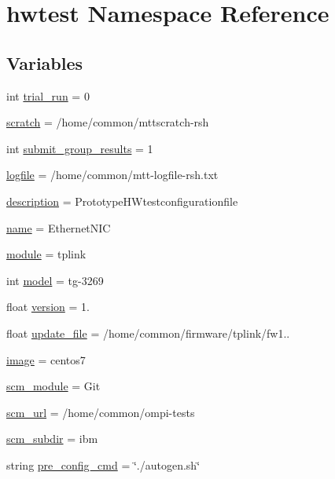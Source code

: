 \hypertarget{namespacehwtest}{\section{hwtest Namespace Reference}
\label{namespacehwtest}
}
\subsection*{Variables}
\begin{DoxyCompactItemize}
\item 
int \hyperlink{namespacehwtest_a2974a3de34764ea05c838464d476f407}{trial\-\_\-run} = 0
\item 
\hyperlink{namespacehwtest_a877f35b716655c4bfeb4955018d305cb}{scratch} = /home/common/mttscratch-\/rsh
\item 
int \hyperlink{namespacehwtest_ae28e9902dd28944ecda9bacac16b28b5}{submit\-\_\-group\-\_\-results} = 1
\item 
\hyperlink{namespacehwtest_a741c9ed9ca6a98101b7fb9d19d68c869}{logfile} = /home/common/mtt-\/logfile-\/rsh.\-txt
\item 
\hyperlink{namespacehwtest_a29832146debe207ba418a2c34a72da74}{description} = Prototype\-H\-Wtestconfigurationfile
\item 
\hyperlink{namespacehwtest_afe5609741ec9bca621277528b05b63c8}{name} = Ethernet\-N\-I\-C
\item 
\hyperlink{namespacehwtest_acc1aaeb8f3c26bd3054520cba5b8dfe5}{module} = tplink
\item 
int \hyperlink{namespacehwtest_ae54fc3a5be1cdc41fa34eb22483e6909}{model} = tg-\/3269
\item 
float \hyperlink{namespacehwtest_a4cd2f078f70d7159e347c0a9ddd51f84}{version} = 1.
\item 
float \hyperlink{namespacehwtest_a55a50eaac0f3463a3fc21e41b75050ab}{update\-\_\-file} = /home/common/firmware/tplink/fw1..
\item 
\hyperlink{namespacehwtest_a5c55bb57a925e013f9ffd6f3e5ca99d7}{image} = centos7
\item 
\hyperlink{namespacehwtest_acb222c4c00407c64de9ba5ab1c303cec}{scm\-\_\-module} = Git
\item 
\hyperlink{namespacehwtest_a37abe4e88b4c1525a3b343f47dfc2862}{scm\-\_\-url} = /home/common/ompi-\/tests
\item 
\hyperlink{namespacehwtest_a7d494d98bb3aaabad59bf16dd7c4c9d2}{scm\-\_\-subdir} = ibm
\item 
string \hyperlink{namespacehwtest_a0b55d030449a5be7b3f9946712208ee4}{pre\-\_\-config\-\_\-cmd} = \char`\"{}./autogen.\-sh\char`\"{}

\end{DoxyCompactItemize}
